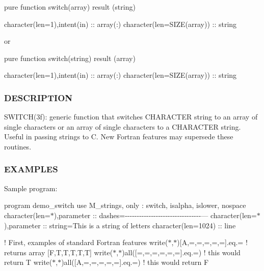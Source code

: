 \begin{DoxyVerb}pure function switch(array) result (string)

 character(len=1),intent(in) :: array(:)
 character(len=SIZE(array))  :: string

or

pure function switch(string) result (array)

 character(len=1),intent(in) :: array(:)
 character(len=SIZE(array))  :: string
\end{DoxyVerb}


\subsubsection*{D\+E\+S\+C\+R\+I\+P\+T\+I\+ON}

\begin{DoxyVerb}SWITCH(3f): generic function that switches CHARACTER string to an array
of single characters or an array of single characters to a CHARACTER
string. Useful in passing strings to C.  New Fortran features may
supersede these routines.
\end{DoxyVerb}


\subsubsection*{E\+X\+A\+M\+P\+L\+ES}

Sample program\+:

program demo\+\_\+switch use M\+\_\+strings, only \+: switch, isalpha, islower, nospace character(len=$\ast$),parameter \+:\+: dashes=\textquotesingle{}-\/-\/-\/-\/-\/-\/-\/-\/-\/-\/-\/-\/-\/-\/-\/-\/-\/-\/-\/-\/-\/-\/-\/-\/-\/-\/-\/-\/-\/-\/-\/-\/---\textquotesingle{} character(len=$\ast$),parameter \+:\+: string=\textquotesingle{}This is a string of letters\textquotesingle{} character(len=1024) \+:\+: line

! First, examples of standard Fortran features write($\ast$,$\ast$)\mbox{[}\textquotesingle{}A\textquotesingle{},\textquotesingle{}=\textquotesingle{},\textquotesingle{}=\textquotesingle{},\textquotesingle{}=\textquotesingle{},\textquotesingle{}=\textquotesingle{},\textquotesingle{}=\textquotesingle{}\mbox{]}.eq.\textquotesingle{}=\textquotesingle{} ! returns array \mbox{[}F,T,T,T,T,T\mbox{]} write($\ast$,$\ast$)all(\mbox{[}\textquotesingle{}=\textquotesingle{},\textquotesingle{}=\textquotesingle{},\textquotesingle{}=\textquotesingle{},\textquotesingle{}=\textquotesingle{},\textquotesingle{}=\textquotesingle{},\textquotesingle{}=\textquotesingle{}\mbox{]}.eq.\textquotesingle{}=\textquotesingle{}) ! this would return T write($\ast$,$\ast$)all(\mbox{[}\textquotesingle{}A\textquotesingle{},\textquotesingle{}=\textquotesingle{},\textquotesingle{}=\textquotesingle{},\textquotesingle{}=\textquotesingle{},\textquotesingle{}=\textquotesingle{},\textquotesingle{}=\textquotesingle{}\mbox{]}.eq.\textquotesingle{}=\textquotesingle{}) ! this would return F

